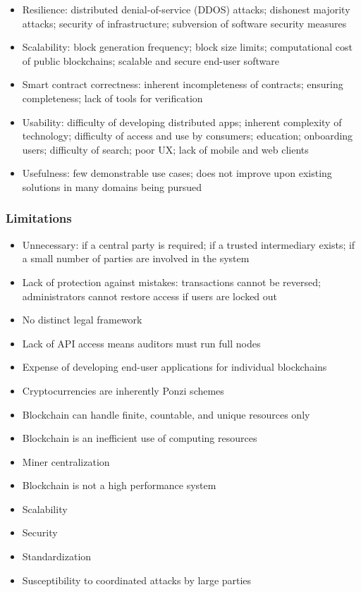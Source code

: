 {\begin{itemize}
	\item{Resilience: distributed denial-of-service (DDOS) attacks; dishonest majority attacks; security of infrastructure; subversion of software security measures}
	\item{Scalability: block generation frequency; block size limits; computational cost of public blockchains; scalable and secure end-user software}
	\item{Smart contract correctness: inherent incompleteness of contracts; ensuring completeness; lack of tools for verification}
	\item{Usability: difficulty of developing distributed apps; inherent complexity of technology; difficulty of access and use by consumers; education; onboarding users; difficulty of search; poor UX; lack of mobile and web clients}
	\item{Usefulness: few demonstrable use cases; does not improve upon existing solutions in many domains being pursued}
\end{itemize}

\subsubsection{Limitations}
\begin{itemize}
	\item{Unnecessary: if a central party is required; if a trusted intermediary exists; if a small number of parties are involved in the system}
	\item{Lack of protection against mistakes: transactions cannot be reversed; administrators cannot restore access if users are locked out}
	\item{No distinct legal framework}
	\item{Lack of API access means auditors must run full nodes}
	\item{Expense of developing end-user applications for individual blockchains}
	\item{Cryptocurrencies are inherently Ponzi schemes}
	\item{Blockchain can handle finite, countable, and unique resources only}
	\item{Blockchain is an inefficient use of computing resources}
	\item{Miner centralization}
	\item{Blockchain is not a high performance system}
	\item{Scalability}
	\item{Security}
	\item{Standardization}
	\item{Susceptibility to coordinated attacks by large parties}
\end{itemize}

}
